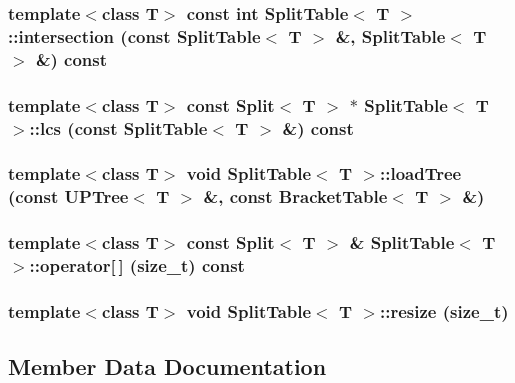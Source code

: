\subsubsection{\setlength{\rightskip}{0pt plus 5cm}template$<$class T$>$ const int {\bf Split\-Table}$<$ T $>$::intersection (const {\bf Split\-Table}$<$ T $>$ \&, {\bf Split\-Table}$<$ T $>$ \&) const}\label{classSplitTable_a8}


\subsubsection{\setlength{\rightskip}{0pt plus 5cm}template$<$class T$>$ const {\bf Split}$<$ T $>$ $\ast$ {\bf Split\-Table}$<$ T $>$::lcs (const {\bf Split\-Table}$<$ T $>$ \&) const}\label{classSplitTable_a7}


\subsubsection{\setlength{\rightskip}{0pt plus 5cm}template$<$class T$>$ void {\bf Split\-Table}$<$ T $>$::load\-Tree (const {\bf UPTree}$<$ T $>$ \&, const {\bf Bracket\-Table}$<$ T $>$ \&)}\label{classSplitTable_a6}


\subsubsection{\setlength{\rightskip}{0pt plus 5cm}template$<$class T$>$ const {\bf Split}$<$ T $>$ \& {\bf Split\-Table}$<$ T $>$::operator[$\,$] (size\_\-t) const}\label{classSplitTable_a5}


\subsubsection{\setlength{\rightskip}{0pt plus 5cm}template$<$class T$>$ void {\bf Split\-Table}$<$ T $>$::resize (size\_\-t)}\label{classSplitTable_a3}




\subsection{Member Data Documentation}
